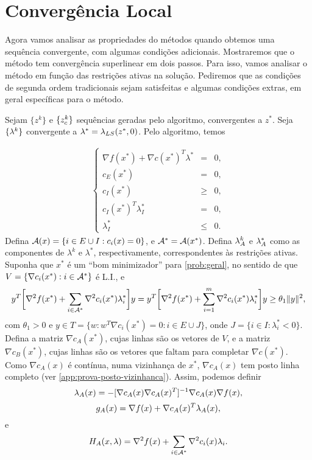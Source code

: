 \section{Convergência Local}

Agora vamos analisar as propriedades do métodos quando obtemos uma sequência
convergente, com algumas condições adicionais. Mostraremos que o método tem
convergência superlinear em dois passos. Para isso, vamos analisar o método em
função das restrições ativas na solução. Pediremos que as condições de segunda
ordem tradicionais sejam satisfeitas e algumas condições extras, em geral
específicas para o método.

Sejam $\{z^k\}$ e $\{z_c^{k}\}$ sequências geradas pelo algoritmo, convergentes
a $z^*$. Seja $\{\lambda^{k}\}$ convergente a $\lambda^* = \lambda_{LS}(z^*,0)$. Pelo
algoritmo, temos

\begin{eqnarray*}
 \left\{
\begin{array}{rcl}
 \nabla f(x^*) + \nabla c(x^*)^T\lambda^* & = & 0, \\
 c_E(x^*) & = & 0, \\
 c_I(x^*) & \geq & 0, \\
 c_I(x^*)^T\lambda_I^* & = & 0, \\
 \lambda_I^* & \leq & 0.
\end{array}
\right.
\end{eqnarray*}
Defina $\mathcal{A}(x) = \{i \in E\cup I : c_i(x) = 0\}$, e $\mathcal{A}^* = \mathcal{A}(x^*)$.
Defina $\lambda_A^k$ e $\lambda_A^*$ como as componentes de $\lambda^k$ e $\lambda^*$,
respectivamente, correspondentes às restrições ativas.
Suponha que $x^*$ é um ``bom minimizador'' para \eqref{prob:geral}, no sentido
de que $V = \{\nabla c_i(x^*) : i \in \mathcal{A}^*\}$ é L.I., e
\begin{eqnarray}
 y^T\bigg[\nabla^2 f(x^*) + \sum_{i \in \calA^*}\nabla^2c_i(x^*)\lk{*}_i\bigg]y =
 y^T\bigg[\nabla^2 f(x^*) + \sum_{i = 1}^m\nabla^2 c_i(x^*)\lambda_i^*\bigg]y \geq
 \theta_1\norma{y}^2, \visiblelbl{eq:defpos}
\end{eqnarray}
com $\theta_1 > 0$ e $y \in T = \{w : w^T\nabla c_i(x^*) = 0 : i \in E \cup J\}$, onde $J = \{i \in I:
 \lambda_i^* < 0\}$.
Defina a matriz $\nabla c_A(x^*)$, cujas linhas são os vetores de $V$, e a matriz $\nabla
 c_B(x^*)$, cujas linhas são os vetores que faltam para completar $\nabla c(x^*)$.
Como $\nabla c_A(x)$ é contínua, numa vizinhança de $x^*$, $\nabla c_A(x)$ tem posto linha
completo (ver \ref{app:prova-posto-vizinhanca}). Assim, podemos definir
$$\lambda_A(x) = -[\nabla c_A(x)\nabla c_A(x)^T]^{-1}\nabla c_A(x) \nabla f(x),$$
$$g_A(x) = \nabla f(x) + \nabla c_A(x)^T\lambda_A(x),$$
e 
$$H_A(x,\lambda) = \nabla^2 f(x) + \sum_{i \in \mathcal{A}^*}\nabla^2 c_i(x)\lambda_i.$$

